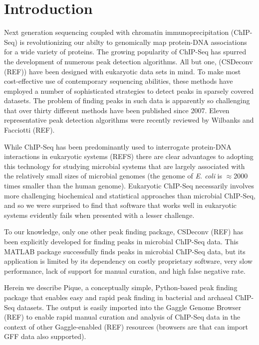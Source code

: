 \documentclass{bioinfo}
\begin{document}
\section{Introduction}

\noindent Next generation sequencing coupled with chromatin
immunoprecipitation (ChIP-Seq) is revolutionizing our abilty to
genomically map protein-DNA associations for a wide variety of
proteins.  The growing popularity of ChIP-Seq has spurred the
development of numerous peak detection algorithms.  All but one,
(CSDeconv (REF)) have been designed with eukaryotic data sets in mind.
To make most cost-effective use of contemporary sequencing abilities,
these methods have employed a number of sophisticated strategies to
detect peaks in sparsely covered datasets. The problem of finding
peaks in such data is apparently so challenging that over thirty
different methods have been published since 2007. Eleven
representative peak detection algorithms were recently reviewed by
Wilbanks and Facciotti (REF).

While ChIP-Seq has been predominantly used to interrogate protein-DNA
interactions in eukaryotic systems (REFS) there are clear advantages
to adopting this technology for studying microbial systems that are
largely associated with the relatively small sizes of microbial
genomes (the genome of {\em E. coli} is $\approx$2000 times smaller
than the human genome). Eukaryotic ChIP-Seq necessarily involves more
challenging biochemical and statistical approaches than microbial
ChIP-Seq, and so we were surprised to find that software that works
well in eukaryotic systems evidently fails when presented with a
lesser challenge.

To our knowledge, only one other peak finding package, CSDeconv (REF)
has been explicitly developed for finding peaks in microbial ChIP-Seq
data. This MATLAB package successfully finds peaks in microbial
ChIP-Seq data, but its application is limited by its dependency on
costly proprietary software, very slow performance, lack of support
for manual curation, and high false negative rate.

Herein we describe Pique, a conceptually simple, Python-based peak
finding package that enables easy and rapid peak finding in bacterial
and archaeal ChIP-Seq datasets.  The output is easily imported into
the Gaggle Genome Browser (REF) to enable rapid manual curation and
analysis of ChIP-Seq data in the context of other Gaggle-enabled (REF)
resources (browsers are that can import GFF data also supported).
\end{document}
